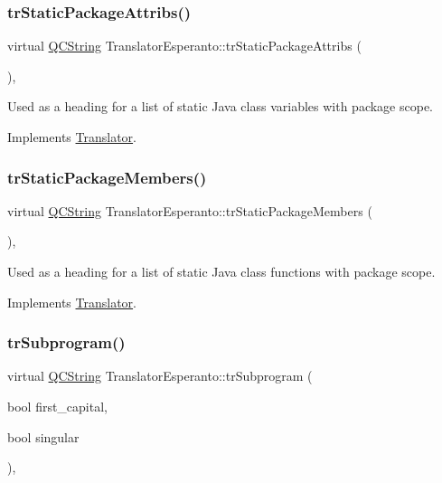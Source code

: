 \subsubsection{\texorpdfstring{trStaticPackageAttribs()}{trStaticPackageAttribs()}}
{\footnotesize\ttfamily virtual \mbox{\hyperlink{class_q_c_string}{Q\+C\+String}} Translator\+Esperanto\+::tr\+Static\+Package\+Attribs (\begin{DoxyParamCaption}{ }\end{DoxyParamCaption})\hspace{0.3cm}{\ttfamily [inline]}, {\ttfamily [virtual]}}

Used as a heading for a list of static Java class variables with package scope. 

Implements \mbox{\hyperlink{class_translator}{Translator}}.

\mbox{\label{class_translator_esperanto_a3af1d8c5b82aa3943ce16d8261511fbf}} 
\subsubsection{\texorpdfstring{trStaticPackageMembers()}{trStaticPackageMembers()}}
{\footnotesize\ttfamily virtual \mbox{\hyperlink{class_q_c_string}{Q\+C\+String}} Translator\+Esperanto\+::tr\+Static\+Package\+Members (\begin{DoxyParamCaption}{ }\end{DoxyParamCaption})\hspace{0.3cm}{\ttfamily [inline]}, {\ttfamily [virtual]}}

Used as a heading for a list of static Java class functions with package scope. 

Implements \mbox{\hyperlink{class_translator}{Translator}}.

\mbox{\label{class_translator_esperanto_ab36ab22a0d3e817a6c65f66f7241b3ff}} 
\subsubsection{\texorpdfstring{trSubprogram()}{trSubprogram()}}
{\footnotesize\ttfamily virtual \mbox{\hyperlink{class_q_c_string}{Q\+C\+String}} Translator\+Esperanto\+::tr\+Subprogram (\begin{DoxyParamCaption}\item[{bool}]{first\+\_\+capital,  }\item[{bool}]{singular }\end{DoxyParamCaption})\hspace{0.3cm}{\ttfamily [inline]}, {\ttfamily [virtual]}}

